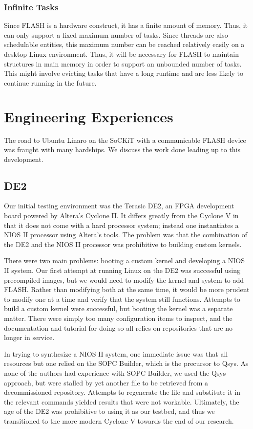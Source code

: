 \documentclass{sig-alternate-10pt}
\begin{document}
\subsubsection{Infinite Tasks}
Since FLASH is a hardware construct, it has a finite amount of memory. Thus,
it can only support a fixed maximum number of tasks. Since threads are also
schedulable entities, this maximum number can be reached relatively easily
on a desktop Linux environment. Thus, it will be necessary for FLASH to
maintain structures in main memory in order to support an unbounded number
of tasks.  This might involve evicting tasks that have a long runtime and
are less likely to continue running in the future.


\section{Engineering Experiences}
\label{sec:eng_exp}
The road to Ubuntu Linaro on the SoCKiT with a communicable FLASH device was fraught with many hardships. We discuss the work done leading up to this development.
\subsection{DE2}
Our initial testing environment was the Terasic DE2, an FPGA development board powered by Altera's Cyclone II. It differs greatly from the Cyclone V in that it does not come with a hard processor system; instead one instantiates a NIOS II processor using Altera's tools. The problem was that the combination of the DE2 and the NIOS II processor was prohibitive to building custom kernels.

There were two main problems: booting a custom kernel and developing a NIOS
II system. Our first attempt at running Linux on the DE2 was successful
using precompiled images, but we would need to modify the kernel and system
to add FLASH. Rather than modifying both at the same time, it would be more
prudent to modify one at a time and verify that the system still functions.
Attempts to build a custom kernel were successful, but booting the kernel
was a separate matter. There were simply too many configuration items to
inspect, and the documentation and tutorial for doing so all relies on
repositories that are no longer in service.

In trying to synthesize a NIOS II system, one immediate issue was that all
resources but one relied on the SOPC Builder, which is the precursor to
Qsys. As none of the authors had experience with SOPC Builder, we used the
Qsys approach, but were stalled by yet another file to be retrieved from
a decommissioned repository. Attempts to regenerate the file and substitute
it in the relevant commands yielded results that were not workable.
Ultimately, the age of the DE2 was prohibitive to using it as our testbed,
and thus we transitioned to the more modern Cyclone V towards the end of our
research.
\end{document}
